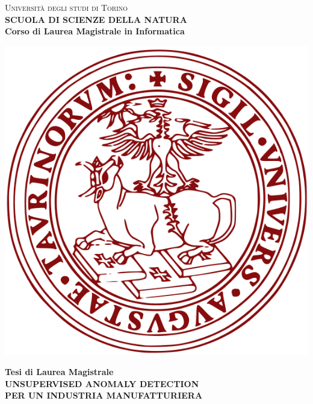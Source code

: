 \begin{titlepage}
\begin{center}
{{\Large{\textsc{Universit\`a degli studi di Torino \\}}}} \vspace{5mm} {\small{\bf SCUOLA DI SCIENZE DELLA NATURA\\ \vspace{3mm}
Corso di Laurea Magistrale in Informatica}}
\vspace{5mm}
\end{center}
\begin{center}
\includegraphics[scale=.3]{head/logo.png}
\end{center}
\begin{center}
\vspace{5mm}
{\large{\bf Tesi di Laurea Magistrale\\}}
\vspace{5mm}
{\LARGE{\bf UNSUPERVISED ANOMALY DETECTION\\ PER UN INDUSTRIA MANUFATTURIERA\\}}
\end{center}
\vspace{20mm}
\par

\end{titlepage}
